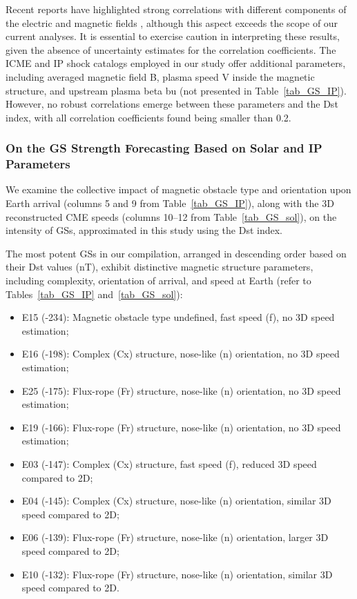 Recent reports have highlighted strong correlations with different components of the electric and magnetic fields \citep{echer_2022}, although this aspect exceeds the scope of our current analyses. It is essential to exercise caution in interpreting these results, given the absence of uncertainty estimates for the correlation coefficients.
The ICME and IP shock catalogs employed in our study offer additional parameters, including averaged magnetic field B, plasma speed V inside the magnetic structure, and upstream plasma beta bu (not presented in Table~\ref{tab_GS_IP}). However, no robust correlations emerge between these parameters and the Dst index, with all correlation coefficients found being smaller than 0.2.

\subsubsection{On the GS Strength Forecasting Based on Solar and IP Parameters}
We examine the collective impact of magnetic obstacle type and orientation upon Earth arrival (columns 5 and 9 from Table~\ref{tab_GS_IP}), along with the 3D reconstructed CME speeds (columns 10–12 from Table~\ref{tab_GS_sol}), on the intensity of GSs, approximated in this study using the Dst index.

The most potent GSs in our compilation, arranged in descending order based on their Dst values (nT), exhibit distinctive magnetic structure parameters, including complexity, orientation of arrival, and speed at Earth (refer to Tables~\ref{tab_GS_IP} and~\ref{tab_GS_sol}):

\begin{itemize}
	\item E15 (-234): Magnetic obstacle type undefined, fast speed (f), no 3D speed estimation;
	\item E16 (-198): Complex (Cx) structure, nose-like (n) orientation, no 3D speed estimation;
	\item E25 (-175): Flux-rope (Fr) structure, nose-like (n) orientation, no 3D speed estimation;
	\item E19 (-166): Flux-rope (Fr) structure, nose-like (n) orientation, no 3D speed estimation;
	\item E03 (-147): Complex (Cx) structure, fast speed (f), reduced 3D speed compared to 2D;
	\item E04 (-145): Complex (Cx) structure, nose-like (n) orientation, similar 3D speed compared to 2D;
	\item E06 (-139): Flux-rope (Fr) structure, nose-like (n) orientation, larger 3D speed compared to 2D;
	\item E10 (-132): Flux-rope (Fr) structure, nose-like (n) orientation, similar 3D speed compared to 2D.
\end{itemize}

